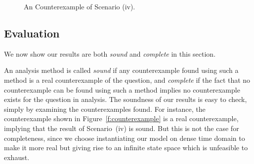 \documentclass[10pt,journal,compsoc]{IEEEtran}
\begin{document}
\begin{figure*}[!t]
\caption{An Counterexample of Scenario (iv).}
\label{f:tikz}
\end{figure*}

\subsection{Evaluation}
We now show our results are both \emph{sound} and \emph{complete} in
this section.

An analysis method is called \emph{sound} if any counterexample found
using such a method is a real counterexample of the question, and
\emph{complete} if the fact that no counterexample can be found using
such a method implies no counterexample exists for the question in
analysis. The soundness of our results is easy to check, simply by
examining the counterexamples found. For instance, the counterexample
shown in Figure~\ref{f:counterexample} is a real counterexample,
implying that the result of Scenario~(iv) is sound. But this is not
the case for completeness, since we choose instantiating our model on
dense time domain to make it more real but giving rise to an infinite
state space which is unfeasible to exhaust.
\end{document}
